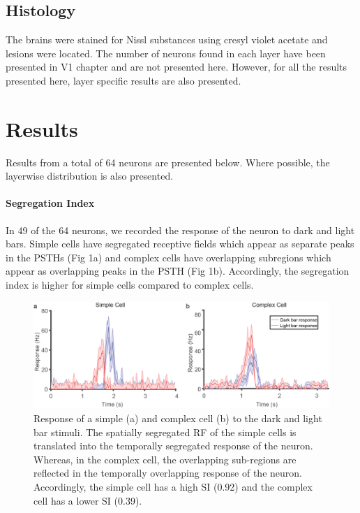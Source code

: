 		\subsection{Histology}
				The brains were stained for Nissl substances using cresyl violet acetate and lesions were located. The number of neurons found in each layer have been presented in V1 chapter and are not presented here. However, for all the results presented here, layer specific results are also presented.
							
					

	\section{Results}
	
		Results from a total of 64 neurons are presented below. Where possible, the layerwise distribution is also presented. 
		
	\paragraph {Segregation Index}	
	In 49 of the 64 neurons, we recorded the response of the neuron to dark and light bars. Simple cells have segregated receptive fields which appear as separate peaks in the PSTHs (Fig 1a) and complex cells have overlapping subregions which appear as overlapping peaks in the PSTH (Fig 1b). Accordingly, the segregation index is higher for simple cells compared to complex cells.
	
		\begin{figure}[H]
		
		\includegraphics[width=\linewidth]{LinearV1/simplecomplex.jpg}
		\caption{Response of a simple (a) and complex cell (b) to the dark and light bar stimuli. The spatially segregated RF of the simple cells is translated into the temporally segregated response of the neuron. Whereas, in the complex cell, the overlapping sub-regions are reflected in the temporally overlapping response of the neuron. Accordingly, the simple cell has a high SI (0.92) and the complex cell has a lower SI (0.39).}
		\label{fig:fig2}
	\end{figure}
	

